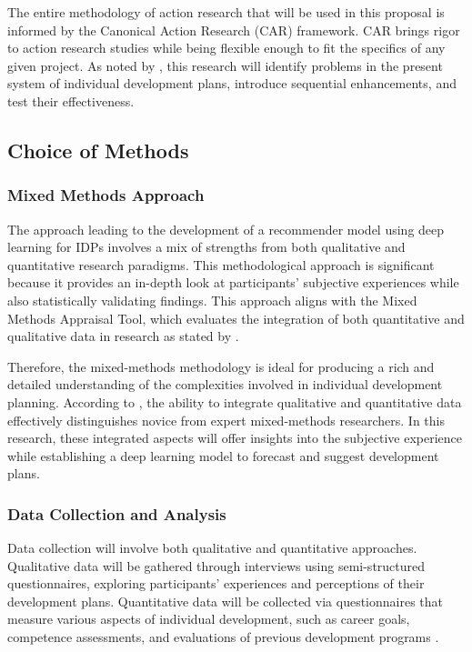 The entire methodology of action research that will be used in this proposal is informed by the Canonical Action Research (CAR) framework. CAR brings rigor to action research studies while being flexible enough to fit the specifics of any given project. As noted by \cite{davison2021research}, this research will identify problems in the present system of individual development plans, introduce sequential enhancements, and test their effectiveness.

\subsection{Choice of Methods}

\subsubsection{Mixed Methods Approach}

The approach leading to the development of a recommender model using deep learning for IDPs involves a mix of strengths from both qualitative and quantitative research paradigms. This methodological approach is significant because it provides an in-depth look at participants' subjective experiences while also statistically validating findings. This approach aligns with the Mixed Methods Appraisal Tool, which evaluates the integration of both quantitative and qualitative data in research as stated by \cite{oliveira2021mixed}.

Therefore, the mixed-methods methodology is ideal for producing a rich and detailed understanding of the complexities involved in individual development planning. According to \cite{guetterman2016distinguishes}, the ability to integrate qualitative and quantitative data effectively distinguishes novice from expert mixed-methods researchers. In this research, these integrated aspects will offer insights into the subjective experience while establishing a deep learning model to forecast and suggest development plans.

\subsubsection{Data Collection and Analysis}

Data collection will involve both qualitative and quantitative approaches. Qualitative data will be gathered through interviews using semi-structured questionnaires, exploring participants' experiences and perceptions of their development plans. Quantitative data will be collected via questionnaires that measure various aspects of individual development, such as career goals, competence assessments, and evaluations of previous development programs \cite{tseng2023mixed}.

